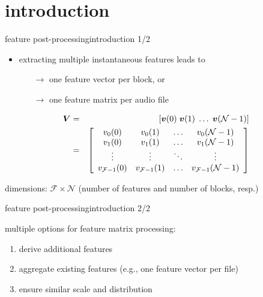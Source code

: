    \section[intro]{introduction}
        \begin{frame}{feature post-processing}{introduction 1/2}
            \begin{itemize}
                \item   extracting multiple instantaneous features leads to 
                    \begin{itemize}
                        \item[$\rightarrow$]   one feature vector per block, or
                        \item[$\rightarrow$]   one feature matrix per audio file
                    \end{itemize}
            \end{itemize}
            \bigskip
			\begin{eqnarray*}
				\mat{V} &=& \left[\vec{v}(0)\; 			\vec{v}(1)\; 				\ldots\;	\vec{v}(\mathcal{N}-1)\right]  \nonumber\\ 
				&=& 				 
						\left[ 
				  			\begin{array}{cccc} 
							v_0(0)					&	v_0(1) 					&	\ldots	&	v_0(\mathcal{N}-1)\\
							v_1(0)					&	v_1(1) 					&	\ldots	&	v_1(\mathcal{N}-1)\\
							\vdots					&	\vdots 					&	\ddots		&	\vdots	\\
							v_{\mathcal{F}-1}(0)	&	v_{\mathcal{F}-1}(1) 	&	\ldots	&	v_{\mathcal{F}-1}(\mathcal{N}-1)\\
							\end{array}  
						\right] 
			\end{eqnarray*}
            
            \bigskip
            \begin{footnotesize}
                dimensions:  $\mathcal{F}\times \mathcal{N}$ (number of features and number of blocks, resp.)
            \end{footnotesize}
        \end{frame}
        
        \begin{frame}{feature post-processing}{introduction 2/2}
            
            multiple options for feature matrix processing:
            \begin{enumerate}   
                \item   derive additional features
                \item   aggregate existing features (e.g., one feature vector per file)
                \item   ensure similar scale and distribution
            \end{enumerate}
        \end{frame}

